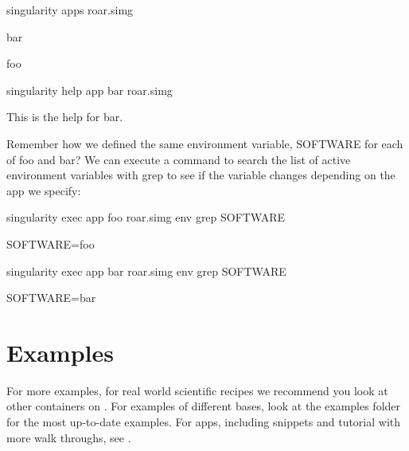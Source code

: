 \documentclass[letterpaper,10pt,english]{sphinxmanual}
\begin{document}

%
\begin{sphinxVerbatim}[commandchars=\\\{\}]
\PYGZdl{} singularity apps roar.simg

bar

foo
\end{sphinxVerbatim}


%
\begin{sphinxVerbatim}[commandchars=\\\{\}]
\PYGZdl{} singularity help \PYGZhy{}\PYGZhy{}app bar roar.simg

This is the help for bar.
\end{sphinxVerbatim}


%
\begin{sphinxVerbatim}[commandchars=\\\{\}]
    

 
\end{sphinxVerbatim}


Remember how we defined the same environment variable, SOFTWARE for
each of foo and bar? We can execute a command to search the list of
active environment variables with grep to see if the variable changes
depending on the app we specify:

%
\begin{sphinxVerbatim}[commandchars=\\\{\}]
\PYGZdl{} singularity exec \PYGZhy{}\PYGZhy{}app foo roar.simg env \textbar{} grep SOFTWARE

SOFTWARE=foo

\PYGZdl{} singularity exec \PYGZhy{}\PYGZhy{}app bar roar.simg env \textbar{} grep SOFTWARE

SOFTWARE=bar
\end{sphinxVerbatim}


\section{Examples}
\label{\detokenize{container_recipes:examples}}
For more examples, for real world scientific recipes we recommend you
look at other containers on . For examples of
different bases, look at the examples folder for the most up-to-date
examples. For apps, including snippets and tutorial with more walk
throughs, see .
\end{document}
